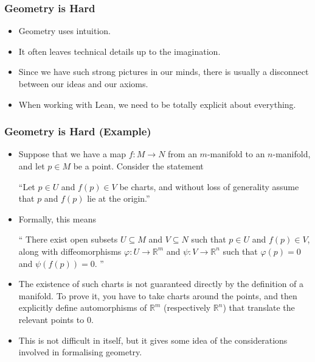 \documentclass{beamer}
\begin{document}
\begin{frame}
    \frametitle{Geometry is Hard}
    \begin{itemize}
        \item Geometry uses intuition.
        \pause
        \item It often leaves technical details up to the imagination.
        \pause 
        \item Since we have such strong pictures in our minds, there is usually a disconnect between our ideas and our axioms.
        \pause 
        \item When working with Lean, we need to be totally explicit about everything. 
    \end{itemize}
\end{frame}
\begin{frame}
    \frametitle{Geometry is Hard (Example)}
    \begin{itemize}
    \item Suppose that we have a map $f: M \to N$ from an $m$-manifold to an $n$-manifold, and let $p \in M$ be a point. Consider the statement 
            \begin{center}
                ``Let $p \in U$ and $f(p) \in V$ be charts, and without loss of generality assume that $p$ and $f(p)$ lie at the origin.'' 
            \end{center}
            \pause 
    \item Formally, this means 
    \begin{center}
        ``
        There exist open subsets $U \subseteq M$ and $V \subseteq N$ such that $p \in U$ and $f(p) \in V$, along with diffeomorphisms $\varphi: U \to \mathbb{R}^m$ and $\psi:V \to \mathbb{R}^n$ such that $\varphi(p) = 0$ and $\psi(f(p)) = 0$. 
        ''
    \end{center}
    \pause 
    \item The existence of such charts is not guaranteed directly by the definition of a manifold. To prove it, you have to take charts around the points, and then explicitly define automorphisms of $\mathbb R^m$ (respectively $\mathbb R^n$) that translate the relevant points to $0$. 
    \pause 
    \item This is not difficult in itself, but it gives some idea of the considerations involved in formalising geometry.  
\end{itemize}
\end{frame}
\end{document}
